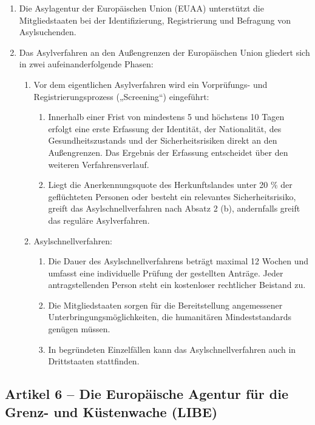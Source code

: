 \documentclass[12pt,a4paper]{article}
\begin{document}
\begin{enumerate}[leftmargin=2em, itemsep=6pt]
  \item Die Asylagentur der Europäischen Union (EUAA) unterstützt die Mitgliedstaaten bei der Identifizierung, Registrierung und Befragung von Asylsuchenden.
  \item Das Asylverfahren an den Außengrenzen der Europäischen Union gliedert sich in zwei aufeinanderfolgende Phasen:
  \begin{enumerate}[label=(\alph*), leftmargin=1.8em, itemsep=4pt]
    \item Vor dem eigentlichen Asylverfahren wird ein Vorprüfungs- und Registrierungsprozess („Screening“) eingeführt:
    \begin{enumerate}[label=(\roman*), leftmargin=1.8em, itemsep=4pt]
      \item Innerhalb einer Frist von mindestens 5 und höchstens 10 Tagen erfolgt eine erste Erfassung der Identität, der Nationalität, des Gesundheitszustands und der Sicherheitsrisiken direkt an den Außengrenzen. Das Ergebnis der Erfassung entscheidet über den weiteren Verfahrensverlauf.
      \item Liegt die Anerkennungsquote des Herkunftslandes unter 20 \% der geflüchteten Personen oder besteht ein relevantes Sicherheitsrisiko, greift das Asylschnellverfahren nach Absatz 2 (b), andernfalls greift das reguläre Asylverfahren.
    \end{enumerate}
    \item Asylschnellverfahren:
    \begin{enumerate}[label=(\roman*), leftmargin=1.8em, itemsep=4pt]
      \item Die Dauer des Asylschnellverfahrens beträgt maximal 12 Wochen und umfasst eine individuelle Prüfung der gestellten Anträge. Jeder antragstellenden Person steht ein kostenloser rechtlicher Beistand zu.
      \item Die Mitgliedstaaten sorgen für die Bereitstellung angemessener Unterbringungsmöglichkeiten, die humanitären Mindeststandards genügen müssen.
      \item In begründeten Einzelfällen kann das Asylschnellverfahren auch in Drittstaaten stattfinden.
    \end{enumerate}
  \end{enumerate}
\end{enumerate}

\subsection*{Artikel 6 – Die Europäische Agentur für die Grenz- und Küstenwache (LIBE)}
\end{document}
